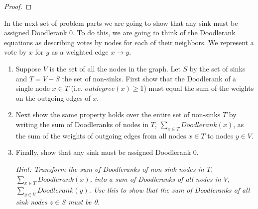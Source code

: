 \documentclass[12pt,twoside]{article}
\begin{document}
\begin{problem}{25}
{\begin{proof}
\end{proof}
}

In the next set of problem parts we are going to show that any sink must be assigned Doodlerank 0. To do this, we are going to think of the Doodlerank equations as describing votes by nodes for each of their neighbors. We represent a vote by $x$ for $y$ as a weighted edge $x \rightarrow y$.

\begin{enumerate}

\item
Suppose $V$ is the set of all the nodes in the graph. Let $S$ by the set of sinks and $T=V-S$ the set of non-sinks. First show that the Doodlerank of a single node $x \in T$ (i.e. $outdegree(x)\geq 1$) must equal the sum of the weights on the outgoing edges of $x$.


\vspace{0.2in}

\item
Next show the same property holds over the entire set of non-sinks $T$ by writing the sum of Doodleranks of nodes in $T$, $\sum_{x \in T} Doodlerank(x)$, as the sum of the weights of outgoing edges from all nodes $x \in T$ to nodes $y \in V$.


\vspace{0.2in}

\item
Finally, show that any sink must be assigned Doodlerank 0.

\textit{Hint: Transform the sum of Doodleranks of non-sink nodes in $T$, $\sum_{x \in T} Doodlerank(x)$, into a sum of Doodleranks of all nodes in $V$, $\sum_{y \in V} Doodlerank(y)$. Use this to show that the sum of Doodleranks of all sink nodes $z \in S$ must be 0.}

\end{enumerate}
\end{problem}
\end{document}
